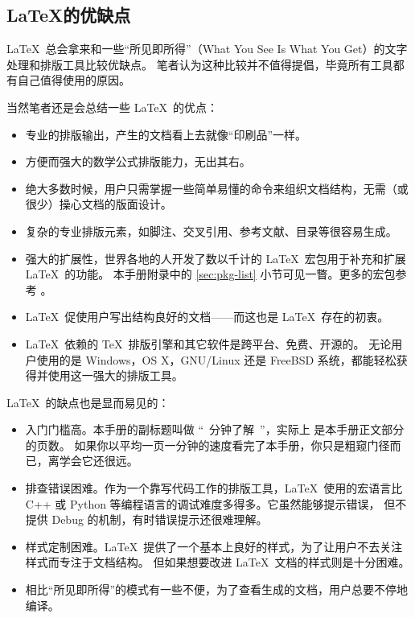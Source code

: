 \subsection{\LaTeX 的优缺点}\label{subec:advs}

\LaTeX\ 总会拿来和一些“所见即所得”（What You See Is What You Get）的文字处理和排版工具比较优缺点。
笔者认为这种比较并不值得提倡，毕竟所有工具都有自己值得使用的原因。

当然笔者还是会总结一些 \LaTeX\ 的优点：

\begin{itemize}
  \item 专业的排版输出，产生的文档看上去就像“印刷品”一样。
  \item 方便而强大的数学公式排版能力，无出其右。
  \item 绝大多数时候，用户只需掌握一些简单易懂的命令来组织文档结构，无需（或很少）操心文档的版面设计。
  \item 复杂的专业排版元素，如脚注、交叉引用、参考文献、目录等很容易生成。
  \item 强大的扩展性，世界各地的人开发了数以千计的 \LaTeX\ 宏包用于补充和扩展 \LaTeX\ 的功能。
  本手册附录中的 \ref{sec:pkg-list} 小节可见一瞥。更多的宏包参考 \companion 。
  \item \LaTeX\ 促使用户写出结构良好的文档——而这也是 \LaTeX\ 存在的初衷。
  \item \LaTeX\ 依赖的 \TeX\ 排版引擎和其它软件是跨平台、免费、开源的。
  无论用户使用的是 Windows，OS X，GNU/Linux 还是 FreeBSD 系统，都能轻松获得并使用这一强大的排版工具。
\end{itemize}

\LaTeX\ 的缺点也是显而易见的：
\begin{itemize}
  \item 入门门槛高。本手册的副标题叫做 “\pageref{lshort-minutes}~分钟了解~\LaTeXe ”，实际上 \pageref{lshort-minutes} 是本手册正文部分的页数。
  如果你以平均一页一分钟的速度看完了本手册，你只是粗窥门径而已，离学会它还很远。
  \item 排查错误困难。作为一个靠写代码工作的排版工具，\LaTeX\ 使用的宏语言比 C++ 或 Python 等编程语言的调试难度多得多。它虽然能够提示错误，
  但不提供 Debug 的机制，有时错误提示还很难理解。
  \item 样式定制困难。\LaTeX\ 提供了一个基本上良好的样式，为了让用户不去关注样式而专注于文档结构。
  但如果想要改进 \LaTeX\ 文档的样式则是十分困难。
  \item 相比“所见即所得”的模式有一些不便，为了查看生成的文档，用户总要不停地编译。
\end{itemize}


